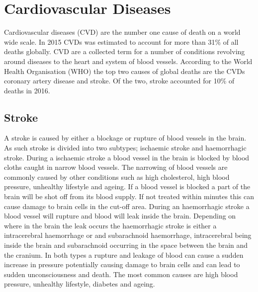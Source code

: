 
\section{Cardiovascular Diseases}

Cardiovascular diseases (CVD) are the number one cause of death on a world wide scale. In 2015 CVDs was estimated to account for more than 31\% of all deaths globally. \cite{whocvd2017} CVD are a collected term for a number of conditions revolving around diseases to the heart and system of blood vessels. According to the World Health Organisation (WHO) the top two causes of global deaths are the CVDs coronary artery disease and stroke. Of the two, stroke accounted for 10\% of deaths in 2016. \cite{whoMortalityStats2018}

\subsection{Stroke}
A stroke is caused by either a blockage or rupture of blood vessels in the brain. As such stroke is divided into two subtypes; ischaemic stroke and haemorrhagic stroke. During a ischaemic stroke a blood vessel in the brain is blocked by blood cloths caught in narrow blood vessels. The narrowing of blood vessels are commonly caused by other conditions such as high cholesterol, high blood pressure, unhealthy lifestyle and ageing. If a blood vessel is blocked a part of the brain will be shot off from its blood supply. If not treated within minutes this can cause damage to brain cells in the cut-off area. \cite{Mackay2002, Hering2016chap7, InternetStroke2018} 
During an haemorrhagic stroke a blood vessel will rupture and blood will leak inside the brain. Depending on where in the brain the leak occurs the haemorrhagic stroke is either a intracerebral haemorrhage or and subarachnoid haemorrhage, intracerebral being inside the brain and subarachnoid occurring in the space between the brain and the cranium. In both types a rupture and leakage of blood can cause a sudden increase in pressure potentially causing damage to brain cells and can lead to sudden unconsciousness and death. The most common causes are high blood pressure, unhealthy lifestyle, diabetes and ageing. \cite{Mackay2002, Hering2016chap8, InternetStroke2018}

